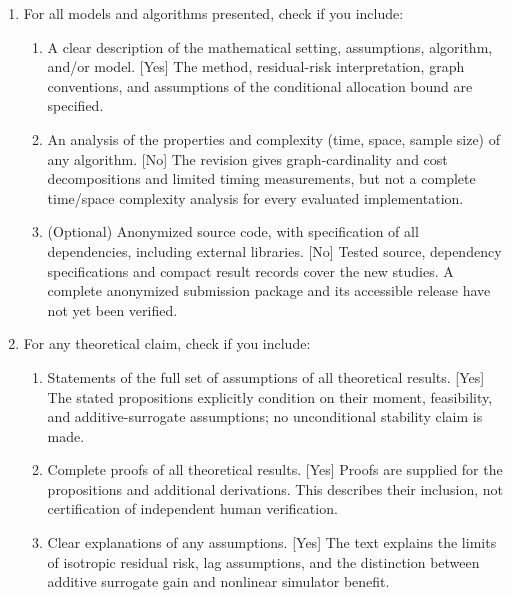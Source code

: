\begin{enumerate}

  \item For all models and algorithms presented, check if you include:
  \begin{enumerate}
    \item A clear description of the mathematical setting, assumptions, algorithm, and/or model. [Yes] The method, residual-risk interpretation, graph conventions, and assumptions of the conditional allocation bound are specified.
    \item An analysis of the properties and complexity (time, space, sample size) of any algorithm. [No] The revision gives graph-cardinality and cost decompositions and limited timing measurements, but not a complete time/space complexity analysis for every evaluated implementation.
    \item (Optional) Anonymized source code, with specification of all dependencies, including external libraries. [No] Tested source, dependency specifications and compact result records cover the new studies. A complete anonymized submission package and its accessible release have not yet been verified.
  \end{enumerate}

  \item For any theoretical claim, check if you include:
  \begin{enumerate}
    \item Statements of the full set of assumptions of all theoretical results. [Yes] The stated propositions explicitly condition on their moment, feasibility, and additive-surrogate assumptions; no unconditional stability claim is made.
    \item Complete proofs of all theoretical results. [Yes] Proofs are supplied for the propositions and additional derivations. This describes their inclusion, not certification of independent human verification.
    \item Clear explanations of any assumptions. [Yes] The text explains the limits of isotropic residual risk, lag assumptions, and the distinction between additive surrogate gain and nonlinear simulator benefit.
  \end{enumerate}


\end{enumerate}
